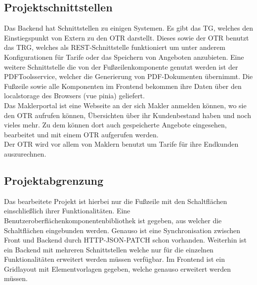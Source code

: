 \subsection{Projektschnittstellen}
\label{projektschnittstellen}
Das Backend hat Schnittstellen zu einigen Systemen. Es gibt das \ac{TG}, welches den Einstiegspunkt von Extern zu den \ac{OTR} darstellt. Dieses sowie der \ac{OTR} benutzt das \ac{TRG}, welches als REST-Schnittstelle funktioniert um unter anderem Konfigurationen für Tarife oder das Speichern von Angeboten anzubieten.
Eine weitere Schnittstelle die von der Fußzeilenkomponente genutzt werden ist der PDFToolsservice, welcher die Generierung von PDF-Dokumenten übernimmt. Die Fußzeile sowie alle Komponenten im Frontend bekommen ihre Daten über den \gls{localstorage} des Browsers (\gls{vue} \gls{pinia}) geliefert.\\
Das Maklerportal ist eine Webseite an der sich Makler anmelden können, wo sie den \ac{OTR} aufrufen können, Übersichten über ihr Kundenbestand haben und noch vieles mehr. Zu dem können dort auch gespeicherte Angebote eingesehen, bearbeitet und mit einem \ac{OTR} aufgerufen werden.\\
Der \ac{OTR} wird vor allem von Maklern benutzt um Tarife für ihre Endkunden auszurechnen.


\subsection{Projektabgrenzung}
\label{projektabgrenzung}
Das bearbeitete Projekt ist hierbei nur die Fußzeile mit den Schaltflächen einschließlich ihrer Funktionalitäten. Eine Benutzeroberflächenkomponentenbibliothek ist gegeben, aus welcher die Schaltflächen eingebunden werden. Genauso ist eine Synchronisation zwischen Front und Backend durch HTTP-JSON-PATCH schon vorhanden. Weiterhin ist ein Backend mit mehreren Schnittstellen welche nur für die einzelnen Funktionalitäten erweitert werden müssen verfügbar. Im Frontend ist ein Gridlayout mit Elementvorlagen gegeben, welche genauso erweitert werden müssen.